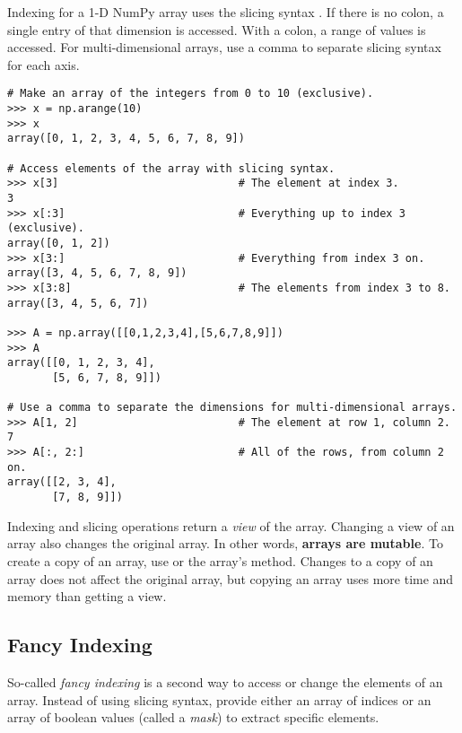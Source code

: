 Indexing for a 1-D NumPy array uses the slicing syntax .
If there is no colon, a single entry of that dimension is accessed.
With a colon, a range of values is accessed.
For multi-dimensional arrays, use a comma to separate slicing syntax for each axis.

\begin{lstlisting}
# Make an array of the integers from 0 to 10 (exclusive).
>>> x = np.arange(10)
>>> x
array([0, 1, 2, 3, 4, 5, 6, 7, 8, 9])

# Access elements of the array with slicing syntax.
>>> x[3]                            # The element at index 3.
3
>>> x[:3]                           # Everything up to index 3 (exclusive).
array([0, 1, 2])
>>> x[3:]                           # Everything from index 3 on.
array([3, 4, 5, 6, 7, 8, 9])
>>> x[3:8]                          # The elements from index 3 to 8.
array([3, 4, 5, 6, 7])

>>> A = np.array([[0,1,2,3,4],[5,6,7,8,9]])
>>> A
array([[0, 1, 2, 3, 4],
       [5, 6, 7, 8, 9]])

# Use a comma to separate the dimensions for multi-dimensional arrays.
>>> A[1, 2]                         # The element at row 1, column 2.
7
>>> A[:, 2:]                        # All of the rows, from column 2 on.
array([[2, 3, 4],
       [7, 8, 9]])
\end{lstlisting}


\begin{info} %
Indexing and slicing operations return a \emph{view} of the array.
Changing a view of an array also changes the original array.
In other words, \textbf{arrays are mutable}.
To create a copy of an array, use  or the array's  method.
Changes to a copy of an array does not affect the original array, but copying an array uses more time and memory than getting a view.
\end{info}

\subsection*{Fancy Indexing} %

So-called \emph{fancy indexing} is a second way to access or change the elements of an array.
Instead of using slicing syntax, provide either an array of indices or an array of boolean values (called a \emph{mask}) to extract specific elements.

